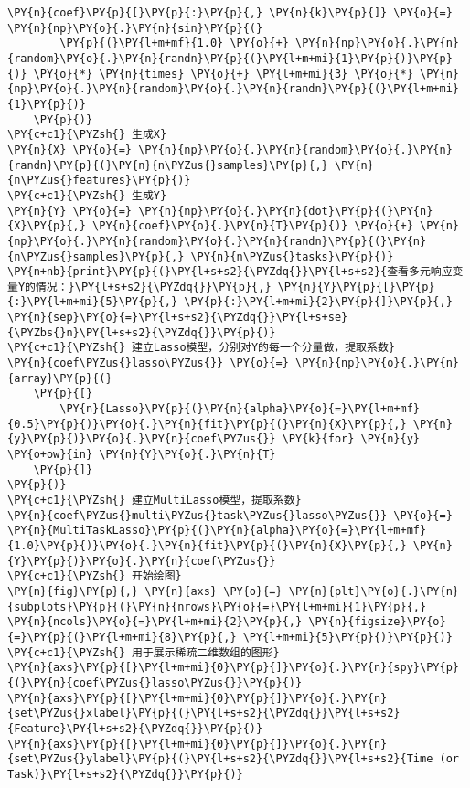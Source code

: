 \begin{Verbatim}[commandchars=\\\{\}]
    \PY{n}{coef}\PY{p}{[}\PY{p}{:}\PY{p}{,} \PY{n}{k}\PY{p}{]} \PY{o}{=} \PY{n}{np}\PY{o}{.}\PY{n}{sin}\PY{p}{(}
        \PY{p}{(}\PY{l+m+mf}{1.0} \PY{o}{+} \PY{n}{np}\PY{o}{.}\PY{n}{random}\PY{o}{.}\PY{n}{randn}\PY{p}{(}\PY{l+m+mi}{1}\PY{p}{)}\PY{p}{)} \PY{o}{*} \PY{n}{times} \PY{o}{+} \PY{l+m+mi}{3} \PY{o}{*} \PY{n}{np}\PY{o}{.}\PY{n}{random}\PY{o}{.}\PY{n}{randn}\PY{p}{(}\PY{l+m+mi}{1}\PY{p}{)}
    \PY{p}{)}
\PY{c+c1}{\PYZsh{} 生成X}
\PY{n}{X} \PY{o}{=} \PY{n}{np}\PY{o}{.}\PY{n}{random}\PY{o}{.}\PY{n}{randn}\PY{p}{(}\PY{n}{n\PYZus{}samples}\PY{p}{,} \PY{n}{n\PYZus{}features}\PY{p}{)}
\PY{c+c1}{\PYZsh{} 生成Y}
\PY{n}{Y} \PY{o}{=} \PY{n}{np}\PY{o}{.}\PY{n}{dot}\PY{p}{(}\PY{n}{X}\PY{p}{,} \PY{n}{coef}\PY{o}{.}\PY{n}{T}\PY{p}{)} \PY{o}{+} \PY{n}{np}\PY{o}{.}\PY{n}{random}\PY{o}{.}\PY{n}{randn}\PY{p}{(}\PY{n}{n\PYZus{}samples}\PY{p}{,} \PY{n}{n\PYZus{}tasks}\PY{p}{)}
\PY{n+nb}{print}\PY{p}{(}\PY{l+s+s2}{\PYZdq{}}\PY{l+s+s2}{查看多元响应变量Y的情况：}\PY{l+s+s2}{\PYZdq{}}\PY{p}{,} \PY{n}{Y}\PY{p}{[}\PY{p}{:}\PY{l+m+mi}{5}\PY{p}{,} \PY{p}{:}\PY{l+m+mi}{2}\PY{p}{]}\PY{p}{,} \PY{n}{sep}\PY{o}{=}\PY{l+s+s2}{\PYZdq{}}\PY{l+s+se}{\PYZbs{}n}\PY{l+s+s2}{\PYZdq{}}\PY{p}{)}
\PY{c+c1}{\PYZsh{} 建立Lasso模型，分别对Y的每一个分量做，提取系数}
\PY{n}{coef\PYZus{}lasso\PYZus{}} \PY{o}{=} \PY{n}{np}\PY{o}{.}\PY{n}{array}\PY{p}{(}
    \PY{p}{[}
        \PY{n}{Lasso}\PY{p}{(}\PY{n}{alpha}\PY{o}{=}\PY{l+m+mf}{0.5}\PY{p}{)}\PY{o}{.}\PY{n}{fit}\PY{p}{(}\PY{n}{X}\PY{p}{,} \PY{n}{y}\PY{p}{)}\PY{o}{.}\PY{n}{coef\PYZus{}} \PY{k}{for} \PY{n}{y} \PY{o+ow}{in} \PY{n}{Y}\PY{o}{.}\PY{n}{T}
    \PY{p}{]}
\PY{p}{)}
\PY{c+c1}{\PYZsh{} 建立MultiLasso模型，提取系数}
\PY{n}{coef\PYZus{}multi\PYZus{}task\PYZus{}lasso\PYZus{}} \PY{o}{=} \PY{n}{MultiTaskLasso}\PY{p}{(}\PY{n}{alpha}\PY{o}{=}\PY{l+m+mf}{1.0}\PY{p}{)}\PY{o}{.}\PY{n}{fit}\PY{p}{(}\PY{n}{X}\PY{p}{,} \PY{n}{Y}\PY{p}{)}\PY{o}{.}\PY{n}{coef\PYZus{}}
\PY{c+c1}{\PYZsh{} 开始绘图}
\PY{n}{fig}\PY{p}{,} \PY{n}{axs} \PY{o}{=} \PY{n}{plt}\PY{o}{.}\PY{n}{subplots}\PY{p}{(}\PY{n}{nrows}\PY{o}{=}\PY{l+m+mi}{1}\PY{p}{,} \PY{n}{ncols}\PY{o}{=}\PY{l+m+mi}{2}\PY{p}{,} \PY{n}{figsize}\PY{o}{=}\PY{p}{(}\PY{l+m+mi}{8}\PY{p}{,} \PY{l+m+mi}{5}\PY{p}{)}\PY{p}{)}
\PY{c+c1}{\PYZsh{} 用于展示稀疏二维数组的图形}
\PY{n}{axs}\PY{p}{[}\PY{l+m+mi}{0}\PY{p}{]}\PY{o}{.}\PY{n}{spy}\PY{p}{(}\PY{n}{coef\PYZus{}lasso\PYZus{}}\PY{p}{)}
\PY{n}{axs}\PY{p}{[}\PY{l+m+mi}{0}\PY{p}{]}\PY{o}{.}\PY{n}{set\PYZus{}xlabel}\PY{p}{(}\PY{l+s+s2}{\PYZdq{}}\PY{l+s+s2}{Feature}\PY{l+s+s2}{\PYZdq{}}\PY{p}{)}
\PY{n}{axs}\PY{p}{[}\PY{l+m+mi}{0}\PY{p}{]}\PY{o}{.}\PY{n}{set\PYZus{}ylabel}\PY{p}{(}\PY{l+s+s2}{\PYZdq{}}\PY{l+s+s2}{Time (or Task)}\PY{l+s+s2}{\PYZdq{}}\PY{p}{)}

\end{Verbatim}

